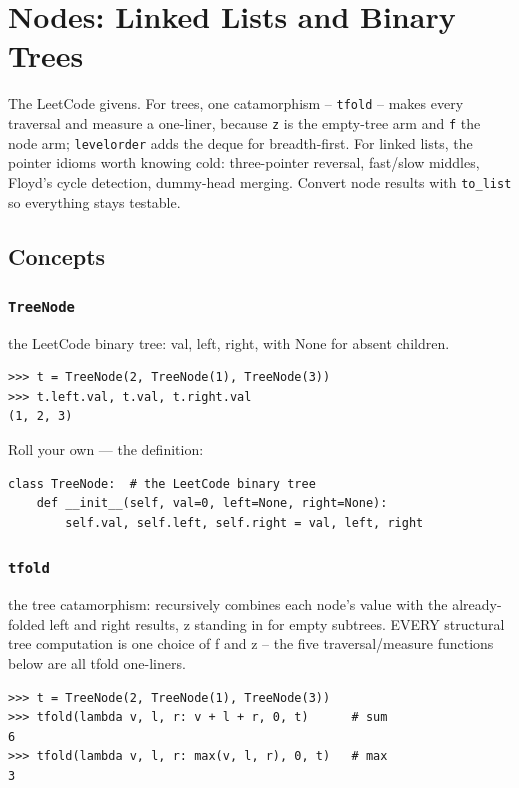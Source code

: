 \documentclass[10pt,letterpaper]{book}
\begin{document}
\clearpage
\chapter{Nodes: Linked Lists and Binary Trees}

The LeetCode givens. For trees, one catamorphism -- \texttt{tfold} -- makes
every traversal and measure a one-liner, because \texttt{z} is the
empty-tree arm and \texttt{f} the node arm; \texttt{levelorder} adds the
deque for breadth-first. For linked lists, the pointer idioms worth knowing
cold: three-pointer reversal, fast/slow middles, Floyd's cycle detection,
dummy-head merging. Convert node results with \texttt{to\_list} so
everything stays testable.
\section{Concepts}
\subsection{\texttt{TreeNode}}\label{def:TreeNode}
the LeetCode binary tree: val, left, right, with None for absent children.
\begin{lstlisting}[style=ex]
>>> t = TreeNode(2, TreeNode(1), TreeNode(3))
>>> t.left.val, t.val, t.right.val
(1, 2, 3)
\end{lstlisting}

Roll your own --- the definition:

\begin{lstlisting}[style=ex]
class TreeNode:  # the LeetCode binary tree
    def __init__(self, val=0, left=None, right=None):
        self.val, self.left, self.right = val, left, right
\end{lstlisting}
\subsection{\texttt{tfold}}\label{def:tfold}
the tree catamorphism: recursively combines each node's value with the already-folded left and right results, z standing in for empty subtrees. EVERY structural tree computation is one choice of f and z -- the five traversal/measure functions below are all tfold one-liners.
\begin{lstlisting}[style=ex]
>>> t = TreeNode(2, TreeNode(1), TreeNode(3))
>>> tfold(lambda v, l, r: v + l + r, 0, t)      # sum
6
>>> tfold(lambda v, l, r: max(v, l, r), 0, t)   # max
3
\end{lstlisting}
\end{document}

